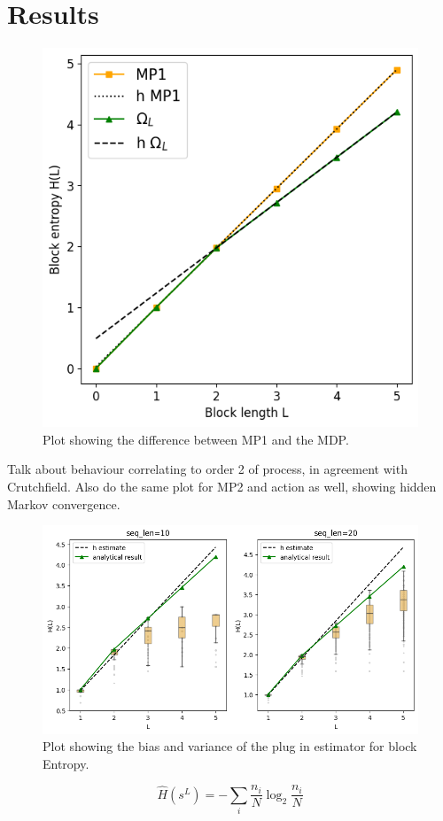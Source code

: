 \documentclass[12pt,a4paper]{article}
\begin{document}
\section{Results} \label{sec:results}

\begin{figure}[H]
    \centering
    \includegraphics[width=0.5\linewidth]{../figures/mp1_vs_obsL.png}
    \caption{\label{fig:mp1_vs_obsL} Plot showing the difference between MP1 and the MDP.}
\end{figure}

Talk about behaviour correlating to order 2 of process, in agreement with Crutchfield.
Also do the same plot for MP2 and action as well, showing hidden Markov convergence.

\newpage
\begin{figure}[H]
    \centering
    \includegraphics[width=1\linewidth]{../figures/block_entropy_estimation.png}
    \caption{\label{fig:mp1_vs_obsL} Plot showing the bias and variance of the plug in estimator for block Entropy.}
\end{figure}

$$\hat{H}(s^L) = -\sum_i \frac{n_i}{N} \log_2{\frac{n_i}{N}}$$
\end{document}
